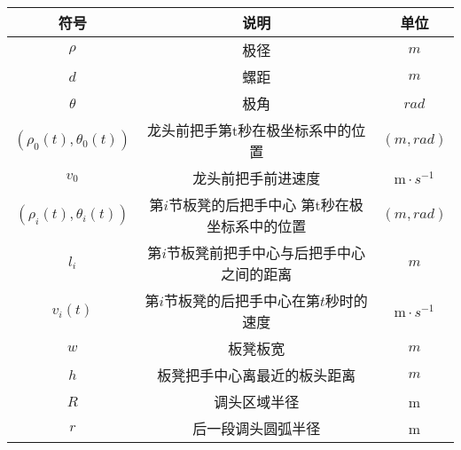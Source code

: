 \documentclass[../main.tex]{subfiles}
\begin{document}



\begin{table}[H]
\centering
\renewcommand{\arrayrulewidth}{2.0pt}
\begin{tabular}{ccc}
\hline
符号 & 说明 & 单位  \\ 
\hline
$\rho$                 & 极径                     & $m$                      \\
$d$                   & 螺距                      &   $m$                    \\
$\theta $                    & 极角                     & $rad$                      \\
\((\rho _0(t),\theta _0(t))\)       & 龙头前把手第t秒在极坐标系中的位置                   & $(m,rad) $                     \\
\(v_0\)                      & 龙头前把手前进速度                     & $\mathrm{m}\cdot s^{-1} $              \\
\((\rho _{i}(t),\theta _{i}(t))\)                   & 第\(i\)节板凳的后把手中心 第t秒在极坐标系中的位置                     & $(m,rad) $                      \\
$l_i$             &   第$i$节板凳前把手中心与后把手中心之间的距离                   & $m$                      \\
\(v_i(t)\)                     & 第\(i\)节板凳的后把手中心在第\(t\)秒时的速度                     &  $\mathrm{m}\cdot s^{-1} $                    \\
$w$                      & 板凳板宽                     & $m$                      \\
$h$                   & 板凳把手中心离最近的板头距离                     & $m$                       \\
$R$                     & 调头区域半径                     & m                      \\
$r$                      & 后一段调头圆弧半径                      & m                       \\
\hline
\end{tabular}
\end{table}
\end{document}

